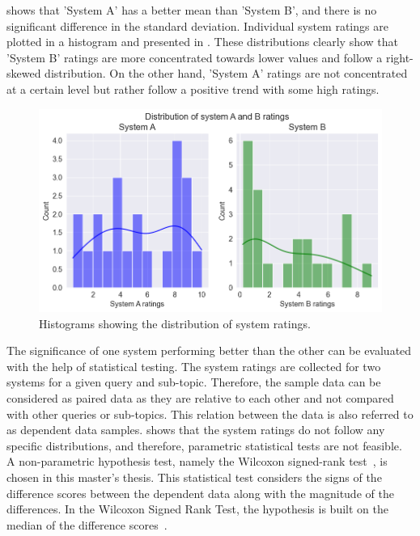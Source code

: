  shows that 'System A' has a better mean than 'System B', and there is no significant difference in the standard deviation. Individual system ratings are plotted in a histogram and presented in . These distributions clearly show that 'System B' ratings are more concentrated towards lower values and follow a right-skewed distribution. On the other hand, 'System A' ratings are not concentrated at a certain level but rather follow a positive trend with some high ratings.

\begin{figure}[h]
	\centering
	\includegraphics[width=.99\textwidth]{images/subplots/rating_histograms.png}
	\caption{Histograms showing the distribution of system ratings.  \label{fig:histograms}}
\end{figure}



The significance of one system performing better than the other can be evaluated with the help of statistical testing. The system ratings are collected for two systems for a given query and sub-topic. Therefore, the sample data can be considered as paired data as they are relative to each other and not compared with other queries or sub-topics. This relation between the data is also referred to as dependent data samples.  shows that the system ratings do not follow any specific distributions, and therefore, parametric statistical tests are not feasible. A non-parametric hypothesis test, namely the Wilcoxon signed-rank test~\cite{buWilcoxonSigned}, is chosen in this master's thesis. This statistical test considers the signs of the difference scores between the dependent data along with the magnitude of the differences. In the Wilcoxon Signed Rank Test, the hypothesis is built on the median of the difference scores~\cite{buWilcoxonSigned, kaur2015comparative}.


